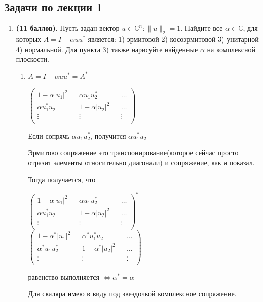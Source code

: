 \documentclass[a4paper, 11pt]{article}
\newcommand{\prob}[1]{\item \textbf{(#1 баллов)}.}
\begin{document}
	\subsection*{Задачи по лекции 1}
	\begin{enumerate}
		\prob{11} Пусть задан вектор $u\in\mathbb{C}^n\colon \|u\|_2=1$. Найдите все $\alpha \in \mathbb{C}$, для которых $A = I - \alpha u u^*$ является: 1) эрмитовой 2) косоэрмитовой 3) унитарной 4) нормальной. Для пункта 3) также нарисуйте найденные $\alpha$ на комплексной плоскости.
		
		\begin{enumerate}
			\item $A = I - \alpha u u^* = A^*$ 
			
				$\begin{pmatrix}
					1 - \alpha |u_1|^2 && \alpha u_1 u_2^*  && \dots \\
					\alpha u_1^* u_2 && 1 - \alpha |u_2|^2   && \dots \\
					\vdots  && \vdots && \vdots \\
				\end{pmatrix}$
			
				Если сопрячь $ \alpha u_1 u_2^*$, получится $\alpha u_1^* u_2$
				
				Эрмитово сопряжение это транспонирование(которое сейчас просто отразит элементы относительно диагонали) и сопряжение, как я показал. 
				
				Тогда получается, что 
				
				$\begin{pmatrix}
					1 - \alpha |u_1|^2 && \alpha u_1 u_2^*  && \dots \\
					\alpha u_1^* u_2 && 1 - \alpha |u_2|^2   && \dots \\
					\vdots  && \vdots && \vdots \\
				\end{pmatrix}^* = $ $\begin{pmatrix}
				1 - \alpha^* |u_1|^2 && \alpha^* u_1^* u_2  && \dots \\
				\alpha^* u_1 u_2^* && 1 - \alpha^* |u_2|^2   && \dots \\
				\vdots  && \vdots && \vdots \\
			\end{pmatrix}$
		
			равенство выполняется $\Longleftrightarrow \alpha^* = \alpha$
			
			Для скаляра имею в виду под звездочкой комплексное сопряжение.
			

\end{enumerate}
\end{enumerate}
\end{document}
